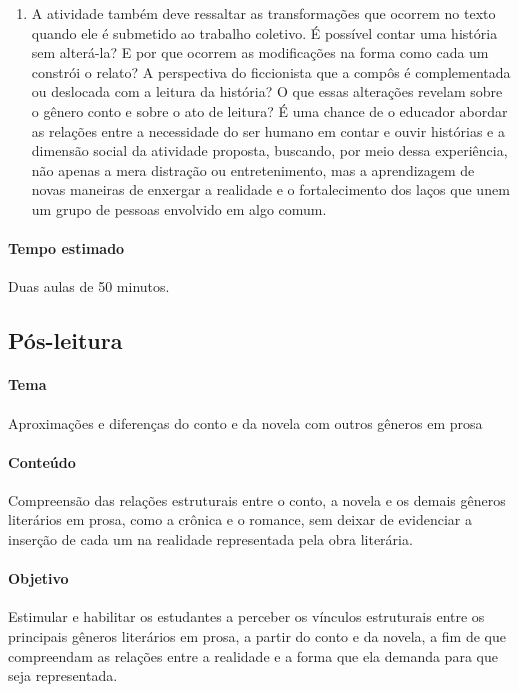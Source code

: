 \documentclass[12pt]{extarticle}
\begin{document}
\begin{enumerate}
\item
A atividade também deve ressaltar as transformações que ocorrem no
texto quando ele é submetido ao trabalho coletivo. É possível contar uma
história sem alterá-la? E por que ocorrem as modificações na forma como
cada um constrói o relato? A perspectiva do ficcionista que a compôs é
complementada ou deslocada com a leitura da história? O que essas
alterações revelam sobre o gênero conto e sobre o ato de leitura? É uma
chance de o educador abordar as relações entre a necessidade do ser
humano em contar e ouvir histórias e a dimensão social da atividade
proposta, buscando, por meio dessa experiência, não apenas a mera
distração ou entretenimento, mas a aprendizagem de novas maneiras de
enxergar a realidade e o fortalecimento dos laços que unem um grupo de
pessoas envolvido em algo comum.
\end{enumerate}

\paragraph{Tempo estimado} Duas aulas de 50 minutos.



\subsection{Pós-leitura}


\paragraph{Tema} Aproximações e diferenças do conto e da novela com
  outros gêneros em prosa 

\paragraph{Conteúdo} Compreensão das relações estruturais entre o conto, a
novela e os demais gêneros literários em prosa, como a crônica e o
romance, sem deixar de evidenciar a inserção de cada um na realidade
representada pela obra literária.

\paragraph{Objetivo} Estimular e habilitar os estudantes a perceber os
vínculos estruturais entre os principais gêneros literários em prosa, a
partir do conto e da novela, a fim de que compreendam as relações entre
a realidade e a forma que ela demanda para que seja representada.
\end{document}

